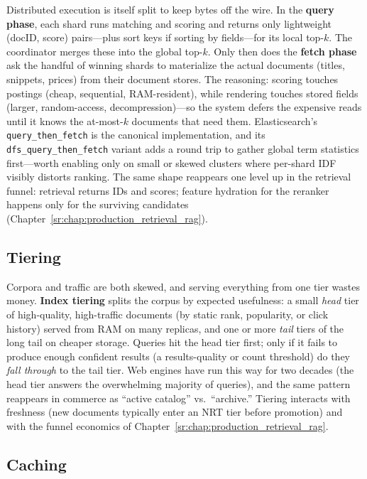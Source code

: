 Distributed execution is itself split to keep bytes off the wire. In the \textbf{query phase}, each shard runs matching and scoring and returns only lightweight (docID, score) pairs---plus sort keys if sorting by fields---for its local top-$k$. The coordinator merges these into the global top-$k$. Only then does the \textbf{fetch phase} ask the handful of winning shards to materialize the actual documents (titles, snippets, prices) from their document stores. The reasoning: scoring touches postings (cheap, sequential, RAM-resident), while rendering touches stored fields (larger, random-access, decompression)---so the system defers the expensive reads until it knows the at-most-$k$ documents that need them. Elasticsearch's \texttt{query\_then\_fetch} is the canonical implementation, and its \texttt{dfs\_query\_then\_fetch} variant adds a round trip to gather global term statistics first---worth enabling only on small or skewed clusters where per-shard IDF visibly distorts ranking. The same shape reappears one level up in the retrieval funnel: retrieval returns IDs and scores; feature hydration for the reranker happens only for the surviving candidates (Chapter~\ref{sr:chap:production_retrieval_rag}).

\subsection{Tiering}

Corpora and traffic are both skewed, and serving everything from one tier wastes money. \textbf{Index tiering} splits the corpus by expected usefulness: a small \emph{head} tier of high-quality, high-traffic documents (by static rank, popularity, or click history) served from RAM on many replicas, and one or more \emph{tail} tiers of the long tail on cheaper storage. Queries hit the head tier first; only if it fails to produce enough confident results (a results-quality or count threshold) do they \emph{fall through} to the tail tier. Web engines have run this way for two decades (the head tier answers the overwhelming majority of queries), and the same pattern reappears in commerce as ``active catalog'' vs.\ ``archive.'' Tiering interacts with freshness (new documents typically enter an NRT tier before promotion) and with the funnel economics of Chapter~\ref{sr:chap:production_retrieval_rag}.

\subsection{Caching}

